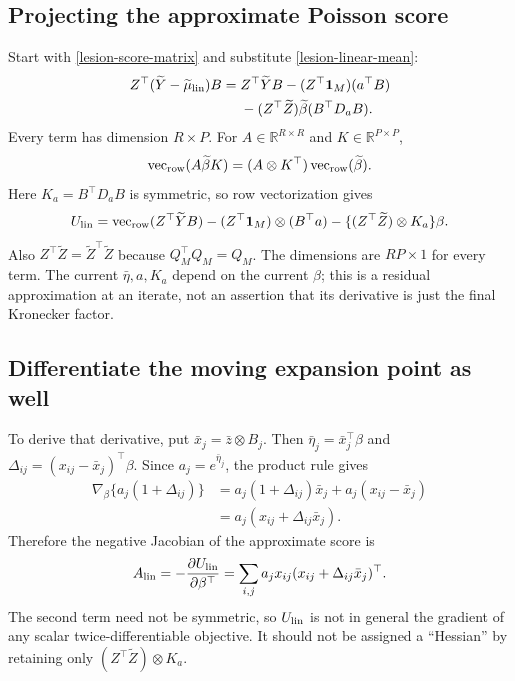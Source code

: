 \documentclass[11pt,a4paper]{article}
\newcommand{\R}{\mathbb R}
\newcommand{\vr}{\operatorname{vec}_{\rm row}}
\numberwithin{equation}{section}
\begin{document}
\subsection{Projecting the approximate Poisson score}
Start with \eqref{lesion-score-matrix} and substitute
\eqref{lesion-linear-mean}:
\begin{align}
 Z^\top(\widetilde Y-\widetilde\mu_{\rm lin})B
 ={}&Z^\top\widetilde YB
 -(Z^\top\mathbf1_M)(a^\top B)\\
 &-(Z^\top \widetilde Z)\widetilde\beta(B^\top D_aB).
 \label{lesion-taylor-matrix}
\end{align}
Every term has dimension $R\times P$.
For $A\in\R^{R\times R}$ and $K\in\R^{P\times P}$,
\[
 \vr(A\widetilde\beta K)=(A\otimes K^\top)\vr(\widetilde\beta).
\]
Here $K_a=B^\top D_aB$ is symmetric, so row vectorization gives
\begin{equation}\label{lesion-taylor-score}
 U_{\rm lin}
 =\vr(Z^\top\widetilde YB)
 -(Z^\top\mathbf1_M)\otimes(B^\top a)
 -\{(Z^\top \widetilde Z)\otimes K_a\}\beta .
\end{equation}
Also $Z^\top \widetilde Z=\widetilde Z^\top \widetilde Z$ because $Q_M^\top Q_M=Q_M$.
The dimensions are $RP\times1$ for every term.
The current $\bar\eta,a,K_a$ depend on the current $\beta$;
this is a residual approximation at an iterate, not an assertion
that its derivative is just the final Kronecker factor.

\subsection{Differentiate the moving expansion point as well}
To derive that derivative, put
$\bar x_j=\bar z\otimes B_j$.
Then $\bar\eta_j=\bar x_j^\top\beta$ and
$\Delta_{ij}=(x_{ij}-\bar x_j)^\top\beta$.
Since $a_j=e^{\bar\eta_j}$, the product rule gives
\begin{align}
 \nabla_\beta\{a_j(1+\Delta_{ij})\}
 &=a_j(1+\Delta_{ij})\bar x_j+
                         a_j(x_{ij}-\bar x_j)\\
 &=a_j(x_{ij}+\Delta_{ij}\bar x_j).
\end{align}
Therefore the negative Jacobian of the approximate score is
\begin{equation}
 A_{\rm lin}=-\frac{\partial U_{\rm lin}}{\partial\beta^\top}
 =\sum_{i,j}a_jx_{ij}(x_{ij}+\Delta_{ij}\bar x_j)^\top .
 \label{lesion-taylor-jacobian}
\end{equation}
The second term need not be symmetric, so $U_{\rm lin}$ is not
in general the gradient of any scalar twice-differentiable objective.
It should not be assigned a ``Hessian'' by retaining only
$(Z^\top\widetilde Z)\otimes K_a$.
\end{document}
